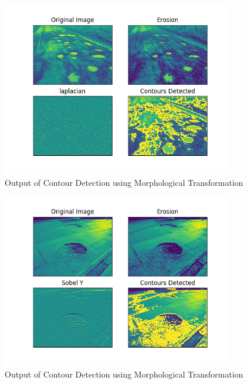 \documentclass[12pt,a4paper]{article}
\begin{document}
\begin{itemize}
    \begin{figure}[ht!]
        \centering
        \includegraphics[width = 4in]{images/morph_transform_2.png}
        \caption{Output of Contour Detection using Morphological Transformation}
    \end{figure}
    

    \begin{figure}[ht!]
        \centering
        \includegraphics[width = 4in]{images/morph_transform_6.png}
        \caption{Output of Contour Detection using Morphological Transformation}
    \end{figure}

\newpage
    


\end{itemize}
\end{document}
